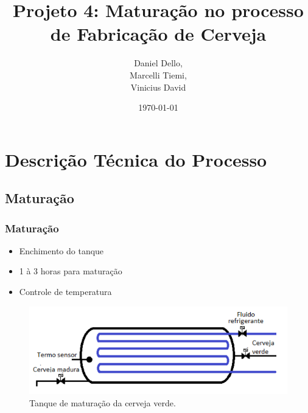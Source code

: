 \documentclass{beamer}
\title[Projeto 4]{Projeto 4: Maturação no processo de Fabricação de Cerveja} %
\author{Daniel Dello,\\ Marcelli Tiemi,\\ Vinicius David} %
\institute[FEM] %
{
Universidade Estadual de Campinas \\ %
\medskip
\textit{} %
}
\date{\today} %
\begin{document}
\begin{frame}
\titlepage %
\end{frame}

\begin{frame}

\tableofcontents %
\end{frame}


\section{Descrição Técnica do Processo} 
\subsection{Maturação}
\begin{frame}
\frametitle{Maturação}
\begin{itemize}
	\item Enchimento do tanque
	\item 1 à 3 horas para maturação
	\item Controle de temperatura
\end{itemize}


	\begin{figure}[H]
		\centering
		\includegraphics [width=0.5\linewidth]{tanque.png}
		\caption {Tanque de maturação da cerveja verde.}
		\label{fig:maturador}
	\end{figure}
\end{frame}
\end{document}

